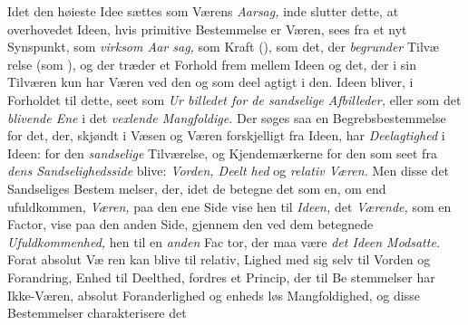 Idet den høieste Idee sættes som Værens \emph{Aarsag,} inde\-%
slutter dette, at overhovedet Ideen, hvis primitive Bestemmelse
er Væren, sees fra et nyt Synspunkt, som \emph{virksom Aar\-%
sag,} som Kraft (), som det, der \emph{begrunder} Tilvæ\-%
relse (som ), og der træder et Forhold frem mellem Ideen
og det, der i sin Tilværen kun har Væren ved den og som deel\-%
agtigt i den. Ideen bliver, i Forholdet til dette, seet som \emph{Ur\-%
billedet for de sandselige Afbilleder,} eller som det
\emph{blivende Ene} i det \emph{vexlende Mangfoldige.} Der søges
saa en Begrebsbestemmelse for det, der, skjøndt i Væsen og
Væren forskjelligt fra Ideen, har \emph{Deelagtighed} i Ideen: for
den \emph{sandselige} Tilværelse, og Kjendemærkerne for den som
seet fra \emph{dens Sandselighedsside} blive: \emph{Vorden, Deelt\-%
hed} og \emph{relativ Væren.} Men disse det Sandseliges Bestem\-%
melser, der, idet de betegne det som en, om end ufuldkommen,
\emph{Væren,} paa den ene Side vise hen til \emph{Ideen,} det \emph{Værende,}
som en Factor, vise paa den anden Side, gjennem den ved
dem betegnede \emph{Ufuldkommenhed,} hen til en \emph{anden} Fac\-%
tor, der maa være \emph{det Ideen Modsatte.} Forat absolut Væ\-%
ren kan blive til relativ, Lighed med sig selv til Vorden og
Forandring, Enhed til Deelthed, fordres et Princip, der til Be\-%
stemmelser har Ikke-Væren, absolut Foranderlighed og enheds\-%
løs Mangfoldighed, og disse Bestemmelser charakterisere det
%
